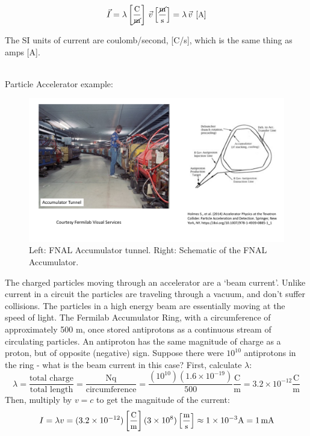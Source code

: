 \documentclass[12pt]{article}
\begin{document}
\begin{flushleft}
\[
\vec{I} = \lambda \left[\frac{\text{\small C}}{\cancel{\text{\small m}}}\right] \, \vec{v} \left[\frac{\cancel{\text{\small m}}}{\text{\small s}}\right]
  = \lambda \, \vec{v}  \: \left[ \text{\small A} \right]
\]

\vspace{.1in}
The SI units of current are coulomb/second, [C/s], which is the same thing as amps [A].

{\color{grey} \hrulefill} \\
Particle Accelerator example:\\
\begin{figure}[h]
\centering
\includegraphics*[trim=1cm 1cm 1cm 1cm, clip=true, width=0.7\columnwidth]{accumulator.pdf}
\caption{\small Left: FNAL Accumulator tunnel.  Right: Schematic of the FNAL Accumulator.}
\label{fig:crush}
\end{figure}

The charged particles moving through an accelerator are a `beam current'.  Unlike current in a circuit the particles are traveling through a vacuum, and don't suffer collisions.  The particles in a high energy beam are essentially moving at the speed of light.  The Fermilab Accumulator Ring, with a circumference of approximately 500 m, once stored antiprotons as a continuous stream of circulating particles.  An antiproton has the same magnitude of charge as a proton, but of opposite (negative) sign.  Suppose there were $10^{10}$ antiprotons in the ring - what is the beam current in this case?  First, calculate $\lambda$:
\[
\lambda = \frac{\text{total charge}}{\text{total length}} = \frac{\text{Nq}}{\text{circumference}} 
= \frac{ (10^{10})(1.6 \times 10^{-19}) }{500} \frac{\text{C}}{\text{m}} =3.2 \times 10^{-12} \frac{\text{C}}{\text{m}}
\]
Then, multiply by $v=c$ to get the magnitude of the current:
\[
I=\lambda v = (3.2 \times 10^{-12}) \left[\frac{\text{\small C}}{\text{\small m}}\right] (3 \times 10^{8}) \left[\frac{\text{\small m}}{\text{\small s}} \right]
\approx 1 \times 10^{-3} \text{A} = 1 \, \text{mA}
\]
{\color{grey} \hrulefill}


\end{flushleft}
\end{document}

